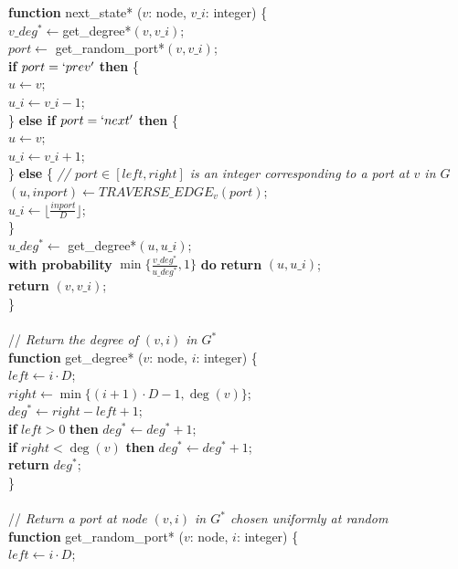 \documentclass[11pt,a4paper]{article}
\renewcommand{\*}{\hspace*{5mm}}
\begin{document}
\textbf{function} next\_state* ($v$: node, $v\_i$: integer) \{\\
\* $v\_deg^* \gets $get\_degree*$(v, v\_i)$;\\
\* $port \gets$ get\_random\_port*$(v, v\_i)$;\\
\* \textbf{if} $port = `prev'$ \textbf{then} \{\\
\* \* $u \gets v$;\\
\* \* $u\_i \gets v\_i-1$;\\
\* \} \textbf{else if} $port = `next'$ \textbf{then} \{\\
\* \* $u \gets v$;\\
\* \* $u\_i \gets v\_i+1$;\\
\* \} \textbf{else} \{ \emph{// $port \in [left, right]$ is an integer corresponding to a port at $v$ in $G$}\\
\* \* $(u, inport) \gets TRAVERSE\_EDGE_{v} (port)$;\\
\* \* $u\_i \gets \lfloor \frac{inport}{D}\rfloor$;\\
\* \}\\
\* $u\_deg^* \gets$ get\_degree*$(u, u\_i)$;\\
\* \textbf{with probability} 
$\min \{\frac{v\_deg^*}{u\_deg^*}, 1\}$ \textbf{do} \textbf{return} $(u, u\_i)$;\\
\* \textbf{return} $(v, v\_i)$;\\
\}\\
\\
// \emph{Return the degree of $(v,i)$ in $G^*$}\\
\textbf{function} get\_degree* ($v$: node, $i$: integer) \{\\
\* $left \gets  i \cdot D$;\\
\* $right \gets  \min\{(i+1)\cdot D-1, \deg(v)\}$;\\
\* $deg^* \gets right - left + 1$;\\
\* \textbf{if} $left >0$ \textbf{then} $deg^* \gets deg^* +1$;\\
\* \textbf{if} $right < \deg(v)$ \textbf{then} $deg^* \gets deg^* +1$;\\
\* \textbf{return} $deg^*$;\\
\}\\
\\
// \emph{Return a port at node $(v,i)$ in $G^*$ chosen uniformly at random}\\
\textbf{function} get\_random\_port* ($v$: node, $i$: integer) \{\\
\* $left \gets  i \cdot D$;\\
\end{document}
